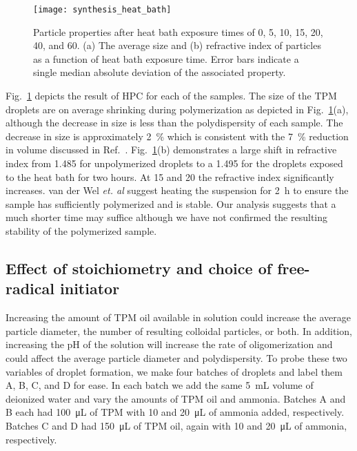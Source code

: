 \begin{figure}
    \centering
    \texttt{[image: synthesis\_heat\_bath]}
    \caption{Particle properties after heat bath exposure times of \num{0}, \num{5},
      \num{10}, \num{15}, \num{20}, \num{40}, and \SI{60}{\min}.
      (a) The average size and (b) refractive index of particles as a function
      of heat bath exposure time. Error bars indicate a single median absolute deviation
      of the associated property.}
    \label{fig:heat_size_time}
\end{figure}

Fig.~\ref{fig:heat_size_time} depicts the result of HPC for each
of the samples. The size of the TPM droplets are on average shrinking
during polymerization as depicted in Fig.~\ref{fig:heat_size_time}(a),
although the decrease in size is less than the polydispersity of each sample.
The decrease in size is approximately \SI{2}{\percent} which is consistent
with the \SI{7}{\percent} reduction in volume discussed in Ref.~\cite{vanderwel17}.
Fig.~\ref{fig:heat_size_time}(b) demonstrates a large shift in refractive index
from \SI{1.485}{} for unpolymerized droplets to a \SI{1.495}{} for the droplets
exposed to the heat bath for two hours.
At \num{15} and \SI{20}{\min} the refractive index significantly increases.
van der Wel \emph{et. al} \cite{vanderwel17} suggest heating the suspension
for \SI{2}{\hour} to ensure the sample has sufficiently polymerized and is
stable. Our analysis suggests that a much shorter time may suffice although
we have not confirmed the resulting stability of the polymerized sample.

\subsection{Effect of stoichiometry and choice of free-radical initiator}

Increasing the amount of TPM oil available in solution could increase the
average particle diameter, the number of resulting colloidal particles, or both.
In addition, increasing the pH of the solution will increase the rate of
oligomerization and could affect the average particle diameter and polydispersity.
To probe these two variables of droplet formation, we make four batches of droplets
and label them A, B, C, and D for ease.
In each batch we add the same \SI{5}{\milli \liter} volume of deionized water
and vary the amounts of TPM oil and ammonia. Batches A and B each had 
\SI{100}{\micro\liter} of TPM with \si{10} and \SI{20}{\micro\liter} of 
ammonia added, respectively. Batches C and D had \SI{150}{\micro\liter} of TPM oil, 
again with \si{10} and \SI{20}{\micro\liter} of ammonia, respectively. 

